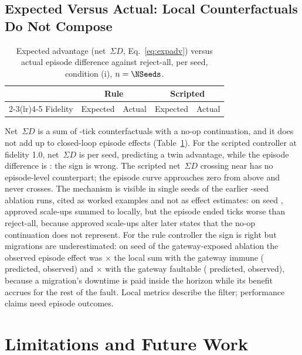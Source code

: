 \documentclass[conference]{IEEEtran}
\newcommand{\netSD}{net~$\Sigma D$}
\newcommand{\NetSD}{Net~$\Sigma D$}
\begin{document}
\subsection{Expected Versus Actual: Local Counterfactuals Do Not Compose}
\begin{table}[t]
\centering
\caption{Expected advantage (\netSD{}, Eq.~\eqref{eq:expadv}) versus actual episode difference against reject-all, per seed, condition (i), $n=\NSeeds$.}
\label{tab:expected}
\footnotesize
\setlength{\tabcolsep}{4pt}
\begin{tabular}{@{}lrrrr@{}}
\toprule
& \multicolumn{2}{c}{Rule} & \multicolumn{2}{c}{Scripted} \\
\cmidrule(lr){2-3}\cmidrule(lr){4-5}
Fidelity & Expected & Actual & Expected & Actual \\
\midrule
\bottomrule
\end{tabular}
\end{table}
\NetSD{} is a sum of \Horizon-tick counterfactuals with a no-op continuation, and it does not add up to closed-loop episode effects (Table~\ref{tab:expected}). For the scripted controller at fidelity 1.0, \netSD{} is \ScrNetTenI{} per seed, predicting a twin advantage, while the episode difference is \ScrEpTenI: the sign is wrong. The scripted \netSD{} crossing near \ScrCrossI{} has no episode-level counterpart; the episode curve approaches zero from above and never crosses. The mechanism is visible in single seeds of the earlier \SignAblationSeeds-seed ablation runs, cited as worked examples and not as effect estimates: on seed \SignSeed, approved scale-ups summed to \SignPredicted{} locally, but the episode ended \SignObserved{} ticks worse than reject-all, because approved scale-ups alter later states that the no-op continuation does not represent. For the rule controller the sign is right but migrations are underestimated: on seed \MigImmuneSeed{} of the gateway-exposed ablation the observed episode effect was \MigImmuneRatio{}$\times$ the local sum with the gateway immune (\MigImmunePredicted{} predicted, \MigImmuneObserved{} observed) and \MigFaultableRatio{}$\times$ with the gateway faultable (\MigFaultablePredicted{} predicted, \MigFaultableObserved{} observed), because a migration's downtime is paid inside the horizon while its benefit accrues for the rest of the fault. Local metrics describe the filter; performance claims need episode outcomes.

\section{Limitations and Future Work}
\label{sec:limits}
\end{document}
